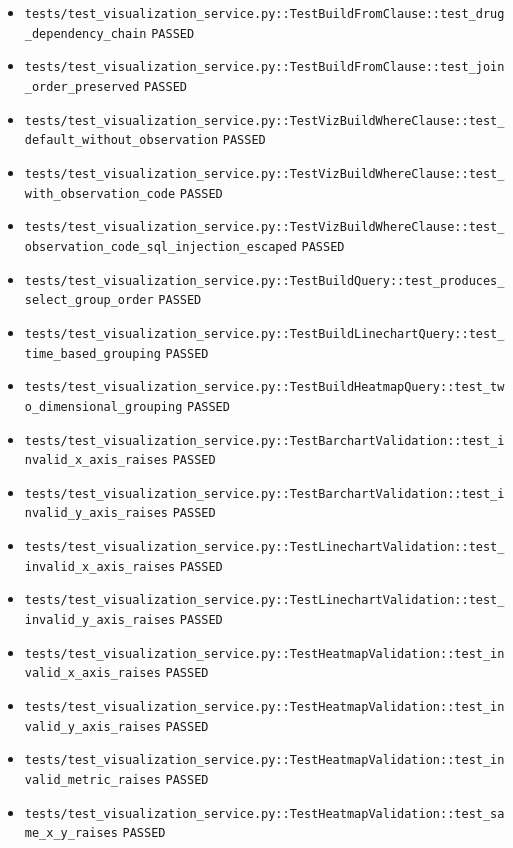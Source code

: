 \documentclass[12pt, titlepage]{article}
\begin{document}
{\begin{itemize}[leftmargin=1.5em, itemsep=0.2em, topsep=0.3em]
  \item \nolinkurl{tests/test_visualization_service.py::TestBuildFromClause::test_drug_dependency_chain} \texttt{PASSED}
  \item \nolinkurl{tests/test_visualization_service.py::TestBuildFromClause::test_join_order_preserved} \texttt{PASSED}
  \item \nolinkurl{tests/test_visualization_service.py::TestVizBuildWhereClause::test_default_without_observation} \texttt{PASSED}
  \item \nolinkurl{tests/test_visualization_service.py::TestVizBuildWhereClause::test_with_observation_code} \texttt{PASSED}
  \item \nolinkurl{tests/test_visualization_service.py::TestVizBuildWhereClause::test_observation_code_sql_injection_escaped} \texttt{PASSED}
  \item \nolinkurl{tests/test_visualization_service.py::TestBuildQuery::test_produces_select_group_order} \texttt{PASSED}
  \item \nolinkurl{tests/test_visualization_service.py::TestBuildLinechartQuery::test_time_based_grouping} \texttt{PASSED}
  \item \nolinkurl{tests/test_visualization_service.py::TestBuildHeatmapQuery::test_two_dimensional_grouping} \texttt{PASSED}
  \item \nolinkurl{tests/test_visualization_service.py::TestBarchartValidation::test_invalid_x_axis_raises} \texttt{PASSED}
  \item \nolinkurl{tests/test_visualization_service.py::TestBarchartValidation::test_invalid_y_axis_raises} \texttt{PASSED}
  \item \nolinkurl{tests/test_visualization_service.py::TestLinechartValidation::test_invalid_x_axis_raises} \texttt{PASSED}
  \item \nolinkurl{tests/test_visualization_service.py::TestLinechartValidation::test_invalid_y_axis_raises} \texttt{PASSED}
  \item \nolinkurl{tests/test_visualization_service.py::TestHeatmapValidation::test_invalid_x_axis_raises} \texttt{PASSED}
  \item \nolinkurl{tests/test_visualization_service.py::TestHeatmapValidation::test_invalid_y_axis_raises} \texttt{PASSED}
  \item \nolinkurl{tests/test_visualization_service.py::TestHeatmapValidation::test_invalid_metric_raises} \texttt{PASSED}
  \item \nolinkurl{tests/test_visualization_service.py::TestHeatmapValidation::test_same_x_y_raises} \texttt{PASSED}

\end{itemize}}
\end{document}
